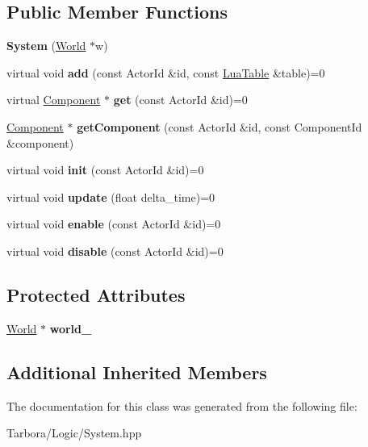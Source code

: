 \subsection*{Public Member Functions}
\begin{DoxyCompactItemize}
\item 
\mbox{\label{classTarbora_1_1System_a74903e3c7ad96875d506083592f58c73}} 
{\bfseries System} (\hyperlink{classTarbora_1_1World}{World} $\ast$w)
\item 
\mbox{\label{classTarbora_1_1System_a9cef14fa184e9e561df817ffa5a45afc}} 
virtual void {\bfseries add} (const Actor\+Id \&id, const \hyperlink{classTarbora_1_1LuaTable}{Lua\+Table} \&table)=0
\item 
\mbox{\label{classTarbora_1_1System_a87b7665cdf911fa8252af0de4f080760}} 
virtual \hyperlink{classTarbora_1_1Component}{Component} $\ast$ {\bfseries get} (const Actor\+Id \&id)=0
\item 
\mbox{\label{classTarbora_1_1System_a08bb90708160b948dc5bfc3c7c8854bc}} 
\hyperlink{classTarbora_1_1Component}{Component} $\ast$ {\bfseries get\+Component} (const Actor\+Id \&id, const Component\+Id \&component)
\item 
\mbox{\label{classTarbora_1_1System_a345f98872294740fb171bb36a439e7e8}} 
virtual void {\bfseries init} (const Actor\+Id \&id)=0
\item 
\mbox{\label{classTarbora_1_1System_ac97bc5bb85a8e4eec07dc89e7bd23eec}} 
virtual void {\bfseries update} (float delta\+\_\+time)=0
\item 
\mbox{\label{classTarbora_1_1System_a1ca7a285f8f8e15648b13d9aab754a06}} 
virtual void {\bfseries enable} (const Actor\+Id \&id)=0
\item 
\mbox{\label{classTarbora_1_1System_af676c7bd8c543199578462246d0b07db}} 
virtual void {\bfseries disable} (const Actor\+Id \&id)=0
\end{DoxyCompactItemize}
\subsection*{Protected Attributes}
\begin{DoxyCompactItemize}
\item 
\mbox{\label{classTarbora_1_1System_a957e428c39b4612a76d32ce237f42251}} 
\hyperlink{classTarbora_1_1World}{World} $\ast$ {\bfseries world\+\_\+}
\end{DoxyCompactItemize}
\subsection*{Additional Inherited Members}


The documentation for this class was generated from the following file\+:\begin{DoxyCompactItemize}
\item 
Tarbora/\+Logic/System.\+hpp\end{DoxyCompactItemize}
